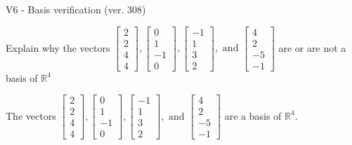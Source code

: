 \begin{exercise}
  \begin{exerciseTitle}V6 - Basis verification (ver. 308)\end{exerciseTitle}
  \begin{exerciseStatement}
    Explain why the vectors \(\left[\begin{array}{r}
2 \\
2 \\
4 \\
4
\end{array}\right] , \left[\begin{array}{r}
0 \\
1 \\
-1 \\
0
\end{array}\right] , \left[\begin{array}{r}
-1 \\
1 \\
3 \\
2
\end{array}\right] , \text{ and } \left[\begin{array}{r}
4 \\
2 \\
-5 \\
-1
\end{array}\right]\) are or are not a basis of \(\mathbb{R}^4\)	


  \end{exerciseStatement}
  \begin{exerciseAnswer}
   The vectors \(\left[\begin{array}{r}
2 \\
2 \\
4 \\
4
\end{array}\right] , \left[\begin{array}{r}
0 \\
1 \\
-1 \\
0
\end{array}\right] , \left[\begin{array}{r}
-1 \\
1 \\
3 \\
2
\end{array}\right] , \text{ and } \left[\begin{array}{r}
4 \\
2 \\
-5 \\
-1
\end{array}\right]\) 
  	 are  a basis of \(\mathbb{R}^4\).
  


  \end{exerciseAnswer}
\end{exercise}